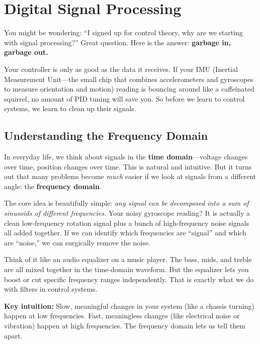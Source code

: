 \section{Digital Signal Processing}

You might be wondering: ``I signed up for control theory, why are we starting with signal processing?'' Great question. Here is the answer: \textbf{garbage in, garbage out.}

Your controller is only as good as the data it receives. If your IMU (Inertial Measurement Unit---the small chip that combines accelerometers and gyroscopes to measure orientation and motion) reading is bouncing around like a caffeinated squirrel, no amount of PID tuning will save you. So before we learn to control systems, we learn to clean up their signals.

\subsection{Understanding the Frequency Domain}

In everyday life, we think about signals in the \textbf{time domain}---voltage changes over time, position changes over time. This is natural and intuitive. But it turns out that many problems become \textit{much} easier if we look at signals from a different angle: the \textbf{frequency domain}.

The core idea is beautifully simple: \textit{any signal can be decomposed into a sum of sinusoids of different frequencies.} Your noisy gyroscope reading? It is actually a clean low-frequency rotation signal plus a bunch of high-frequency noise signals all added together. If we can identify which frequencies are ``signal'' and which are ``noise,'' we can surgically remove the noise.

Think of it like an audio equalizer on a music player. The bass, mids, and treble are all mixed together in the time-domain waveform. But the equalizer lets you boost or cut specific frequency ranges independently. That is exactly what we do with filters in control systems.

\textbf{Key intuition:} Slow, meaningful changes in your system (like a chassis turning) happen at low frequencies. Fast, meaningless changes (like electrical noise or vibration) happen at high frequencies. The frequency domain lets us tell them apart.

